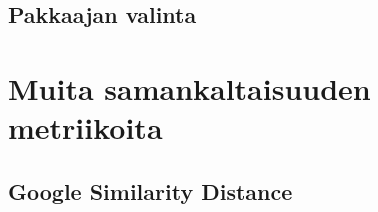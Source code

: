 \documentclass[11pt,finnish]{tktltiki2}
\theoremstyle{definition}
\theoremstyle{remark}
\begin{document}

  \subsection{Pakkaajan valinta} %
  \label{sub:pakkaajan_valinta}

    \iffalse
      TODO: This paper shows that the compressors used to compute the normalized compression distance are not idempotent in some cases, being strongly skewed with the size of the objects and window size, and therefore causing a deviation in the identity property of the distance if we don’t take care that the objects to be compressed fit the windows. The relationship underlying the precision of the distance and the size of the objects has been analyzed for several well-known compressors, and specially in depth for three cases, bzip2, gzip and PPMZ which are examples of the three main types of compressors: block-sorting, Lempel-Ziv, and statistic.
    \fi

\section{Muita samankaltaisuuden metriikoita} %
\label{sec:muita_samankaltaisuuden_metriikoita}
  \subsection{Google Similarity Distance} %
  \label{sub:google_similarity_distance}

%
%

%

% 





%
\end{document}
